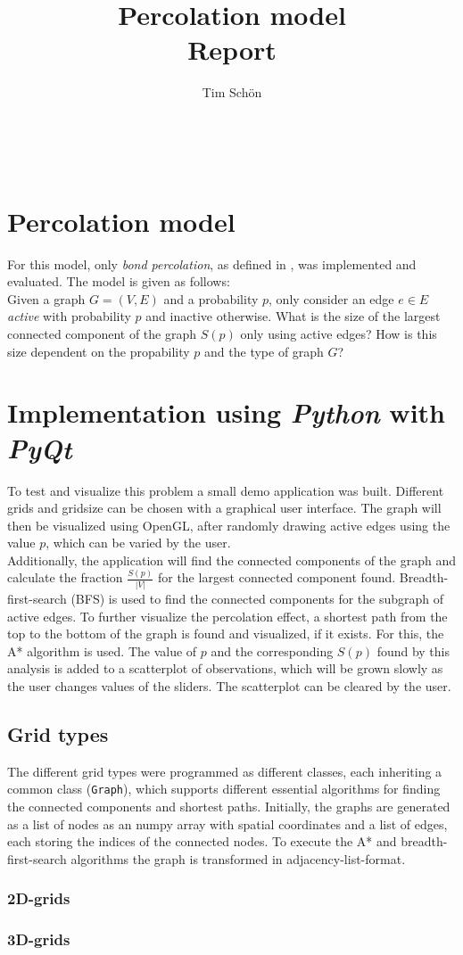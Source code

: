 \documentclass[a4paper,fleqn]{article}
\begin{document}
\title{Percolation model\\ \Large{Report}}
\author{Tim Schön}
\date{}
\maketitle
\ \\

\section*{Percolation model}
For this model, only \emph{bond percolation}, as defined in \cite{Percolation}, was implemented and evaluated. The model is given as follows:\\
Given a graph $G = (V,E)$ and a probability $p$, only consider an edge $e \in E$ \emph{active} with probability $p$ and inactive otherwise. 
What is the size of the largest connected component of the graph $S(p)$ only using active edges? 
How is this size dependent on the propability $p$ and the type of graph $G$?

\section*{Implementation using \emph{Python} with \emph{PyQt}}
To test and visualize this problem a small demo application was built. Different grids and gridsize can be chosen with a graphical 
user interface. The graph will then be visualized using OpenGL, after randomly drawing active edges using the value $p$, which can be varied by the user.\\
Additionally, the application will find the connected components of the graph and calculate the fraction $\frac{S(p)}{|V|}$ for the largest connected component found. Breadth-first-search (BFS) is used to find the connected components for the subgraph of active edges.
To further visualize the percolation effect, a shortest path from the top to the bottom of the graph is found and visualized, if it exists. For this, the A* algorithm is used.
The value of $p$ and the corresponding $S(p)$ found by this analysis is added to a scatterplot of observations, which will be grown slowly as the user changes values of the sliders. 
The scatterplot can be cleared by the user.\\
\subsection*{Grid types}
The different grid types were programmed as different classes, each inheriting a common class (\verb|Graph|), which supports different essential algorithms for finding the connected 
components and shortest paths. Initially, the graphs are generated as a list of nodes as an numpy array with spatial coordinates and a list of edges, each storing the indices of the connected nodes.
To execute the A* and breadth-first-search algorithms the graph is transformed in adjacency-list-format.
\subsubsection*{2D-grids}

\subsubsection*{3D-grids}

\end{document}
